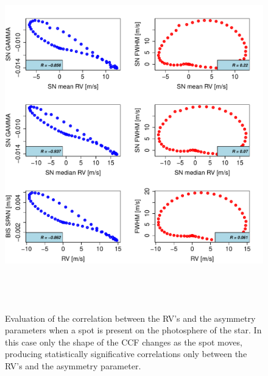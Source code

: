 \documentclass[11pt, oneside]{article}
\begin{document}
\begin{figure}[htbp]
   \centering
\includegraphics[height = 6in]{SOAP_SPOT_Comparison_para_SN.pdf} 
   \caption{Evaluation of the correlation between the RV's and the asymmetry parameters when a spot is present on the photosphere of the star. In this case only the shape of the CCF changes as the spot moves, producing statistically significative correlations only between the RV's and the asymmetry parameter.}
    \label{fig:spot.corr}
\end{figure}
\end{document}

